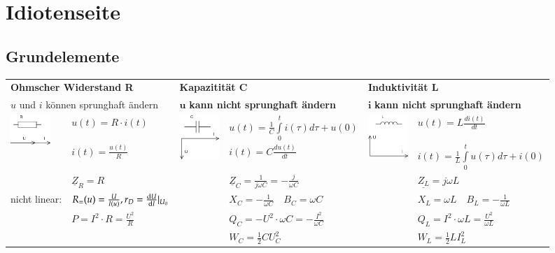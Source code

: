 \section{Idiotenseite}

\renewcommand{\arraystretch}{1.5}
\subsection{Grundelemente}
\begin{tabular}{p{1.5cm} p{4.3cm} |p{1.5cm} p{4.3cm}| p{1.5cm} p{4.3cm}}
	\multicolumn{2}{l}{\textbf{Ohmscher Widerstand R}}
	& \multicolumn{2}{l}{\textbf{Kapazitität C}}
	& \multicolumn{2}{l}{\textbf{Induktivität L}} \\
	\multicolumn{2}{l}{$u$ und $i$ können sprunghaft ändern}
	& \multicolumn{2}{l}{$\mathbf{u}$ \textbf{kann nicht sprunghaft ändern}}
	& \multicolumn{2}{l}{$\mathbf{i}$ \textbf{kann nicht sprunghaft ändern}} \\
	
	\multirow{2}{1.5cm}{
		\includegraphics[width=1.5cm]{./images/zeigerdiag-r.png}}
	& $u(t) = R \cdot i(t)$ 
	& \multirow{2}{1.5cm}{\includegraphics[width=1.5cm]{./images/zeigerdiag-c.png}}
	& $u(t) = \frac{1}{C} \int\limits_0^t i(\tau) d\tau + u(0)$
	& 
	\multirow{2}{1.5cm}{\includegraphics[width=1.5cm]{./images/zeigerdiag-l.png}}
	&$u(t) = L \frac{di(t)}{dt}$\\
	
	&$i(t) = \frac{u(t)}{R}$
	& & $i(t) = C \frac{d u(t)}{dt}$
	& & $i(t) = \frac{1}{L} \int\limits_0^t u(\tau) d\tau + i(0)$\\
	
	& $\underline{Z}_R = R$
	& & $\underline{Z}_C = \frac{1}{j \omega C} = - \frac{j}{\omega C}$
	& & $\underline{Z_L} = j \omega L$\\
	
	\parbox{1.7cm}{\small{nicht linear:}}
	& $R_=(u) = \frac{U}{I(u)}, r_D = \frac{\mathop{}\!\mathrm{d} U}{\mathop{}\!\mathrm{d} I}\lvert_{U_0}$
	& & $X_C = -\frac{1}{\omega C} \quad B_C = \omega C$
	& & $X_L = \omega L
	\quad B_L = -\frac{1}{\omega L}$ \\
	
	& $P=I^2 \cdot R = \frac{U^2}{R}$
	& & $Q_C= - U^2 \cdot \omega C = - \frac{I^2}{\omega C}$
	& & $Q_L= I^2 \cdot \omega L = \frac{U^2}{\omega L}$\\
	
	& & & $W_C=\frac12 C U_C^2$
	& &$W_L=\frac12 L I_L^2$
\end{tabular}

